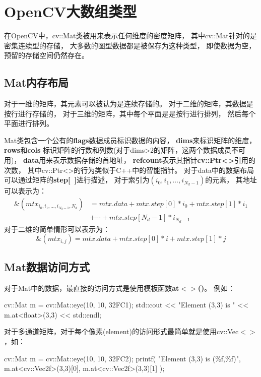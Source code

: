 \chapter{OpenCV大数组类型}
在OpenCV中，cv::Mat类被用来表示任何维度的密度矩阵，%
其中cv::Mat针对的是密集连续型的存储，%
大多数的图型数据都是被保存为这种类型，%
即使数据为空，%
预留的存储空间仍然存在。

\section{Mat内存布局}
对于一维的矩阵，其元素可以被认为是连续存储的。%
对于二维的矩阵，其数据是按行进行存储的，%
对于三维的矩阵，其中每个平面是是按行进行排列，%
然后每个平面进行排列。

Mat类包含一个公有的\textbf{\color{magenta}flags}数据成员标识数据的内容，%
\textbf{\color{magenta}dims}来标识矩阵的维度，%
\textbf{\color{magenta}rows}和\textbf{\color{magenta}cols}
标识矩阵的行数和列数(对于dims>2的矩阵，这两个数据成员不可用)，%
\textbf{\color{magenta}data}用来表示数据存储的首地址，%
\textbf{\color{magenta}refcount}表示其指针\textbf{\color{magenta}cv::Ptr<>}引用的次数，%
其中cv::Ptr<>的行为类似于C++中的智能指针。%
对于data中的数据布局可以通过矩阵的\textbf{\color{magenta}step[~]}进行描述，%
对于索引为$(i_{0},i_{1},\dots,i_{N_{d}-1})$的元素，%
其地址可以表示为：
\begin{equation}
  \begin{split}
    \&\left(mtx_{i_{0},i_{1},\dots,i_{N_{d}-1},N_{d}}\right) & = mtx.data + mtx.step[0]*i_{0}
    + mtx.step[1]*i_{1} \\
    & + \cdots + mtx.step[N_{d}-1]*i_{N_{d}-1}
  \end{split}
\end{equation}
对于二维的简单情形可以表示为：
\begin{equation}
  \&(mtx_{i,j}) = mtx.data + mtx.step[0]*i + mtx.step[1]*j
\end{equation}

\section{Mat数据访问方式}
对于Mat中的数据，最直接的访问方式是使用模板函数\textbf{\color{magenta}at$<>$()}。%
例如：
\begin{cppcode}
  cv::Mat m = cv::Mat::eye(10, 10, 32FC1);
  std::cout << "Element (3,3) is "
            << m.at<float>(3,3) << std::endl;
\end{cppcode}

对于多通道矩阵，对于每个像素(element)的访问形式最简单就是使用cv::Vec$<>$，如：
\begin{cppcode}
  cv::Mat m = cv::Mat::eye(10, 10, 32FC2);
  printf(
    "Element (3,3) is (\%f,\%f)\n",
    m.at<cv::Vec2f>(3,3)[0],
    m.at<cv::Vec2f>(3,3)[1]
    );
\end{cppcode}
          
